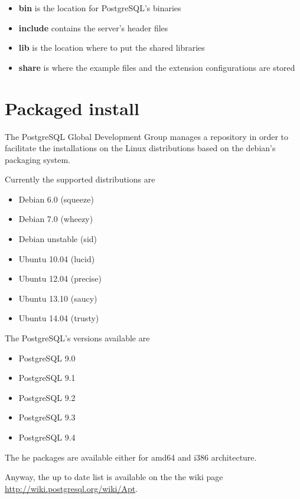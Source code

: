 \begin{itemize}
 \item \textbf{bin} is the location for PostgreSQL's binaries
 \item \textbf{include} contains the server's header files
 \item \textbf{lib} is the location where to put the shared libraries
 \item \textbf{share} is where the example files and the extension configurations are stored
\end{itemize}


\section{Packaged install}
\label{sec:DEBIAN_INSTALL}

The PostgreSQL Global Development Group manages a repository in order to facilitate the
installations on the Linux distributions based on the debian's packaging system. 

Currently the supported distributions are

\begin{itemize}
 \item Debian 6.0 (squeeze)
 \item Debian 7.0 (wheezy)
 \item Debian unstable (sid) 
 \item Ubuntu 10.04 (lucid)
 \item Ubuntu 12.04 (precise)
 \item Ubuntu 13.10 (saucy)
 \item Ubuntu 14.04 (trusty) 
\end{itemize}

The PostgreSQL's versions available are 
\begin{itemize}
 \item PostgreSQL 9.0 
 \item PostgreSQL 9.1 
 \item PostgreSQL 9.2 
 \item PostgreSQL 9.3
 \item PostgreSQL 9.4
\end{itemize}

The he packages are available either for amd64 and i386 architecture.

Anyway, the up to date list is available on the the wiki page 
\href{http://wiki.postgresql.org/wiki/Apt}{http://wiki.postgresql.org/wiki/Apt}.\newline

